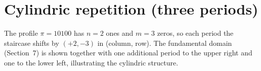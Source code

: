 \documentclass[11pt]{article}
\begin{document}
\begin{center}
\end{center}

\newpage

\section{Cylindric repetition (three periods)}

The profile $\pi = 10100$ has $n = 2$ ones and $m = 3$ zeros, so each period
the staircase shifts by $(+2, -3)$ in (column, row).
The fundamental domain (Section~7) is shown together with one additional
period to the upper right and one to the lower left, illustrating the cylindric structure.
\end{document}
